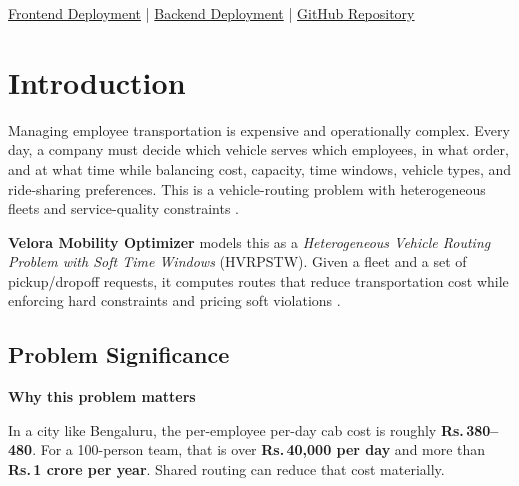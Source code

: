 \documentclass[11pt,a4paper]{article}
\newenvironment{callout}[1]{%
  \par\medskip
  \noindent\textbf{#1}\par
  \small\itshape
}{%
  \par\medskip\normalfont
}
\newcommand{\rupee}{Rs.\,}
\begin{document}
\begin{titlepage}
\vspace{0.4cm}
{\small
\href{https://velorafrontend-kri-2651-ti.onrender.com}{Frontend Deployment}
\quad|\quad
\href{https://velorabackend-kri-2651-ti.onrender.com}{Backend Deployment}
\quad|\quad
\href{https://github.com/bfea-kriti/VeloraMobilityOptimizer}{GitHub Repository}
\par}

\end{titlepage}

\renewcommand{\contentsname}{\Large\bfseries\color{velblue} Table of Contents}
\renewcommand{\cftsecfont}{\bfseries\color{velblue}}
\renewcommand{\cftsecpagefont}{\bfseries\color{velblue}}
\renewcommand{\cftsubsecfont}{\color{veldark}}
\setlength{\cftbeforesecskip}{4pt}
\setlength{\cftbeforesubsecskip}{1pt}
\renewcommand{\cftdotsep}{2}
\tableofcontents
\thispagestyle{fancy}
\newpage

\section{Introduction}

Managing employee transportation is expensive and operationally complex. Every day, a company must decide which vehicle serves which employees, in what order, and at what time while balancing cost, capacity, time windows, vehicle types, and ride-sharing preferences. This is a vehicle-routing problem with heterogeneous fleets and service-quality constraints \cite{solomon1987,toth2014,laporte2009,purba2020}.

\textbf{Velora Mobility Optimizer} models this as a \textit{Heterogeneous Vehicle Routing Problem with Soft Time Windows} (HVRPSTW). Given a fleet and a set of pickup/dropoff requests, it computes routes that reduce transportation cost while enforcing hard constraints and pricing soft violations \cite{dondo2007,ismail2021}.

\subsection*{Problem Significance}
\begin{callout}{Why this problem matters}
In a city like Bengaluru, the per-employee per-day cab cost is roughly \textbf{\rupee 380--480}. For a 100-person team, that is over \textbf{\rupee 40,000 per day} and more than \textbf{\rupee 1 crore per year}. Shared routing can reduce that cost materially.
\end{callout}
\end{document}
